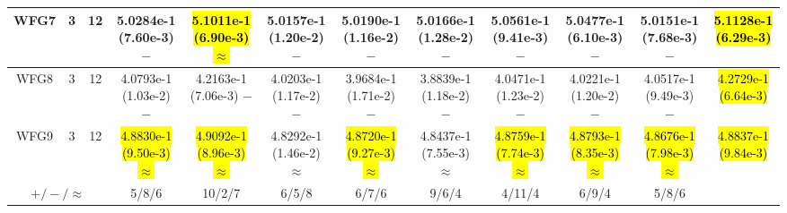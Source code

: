 \documentclass[journal]{IEEEtran}
\begin{document}
\begin{table*}[htbp]
\begin{tabular}{cccccccccccc}
\hline
\multirow{1}{*}{WFG7}&3&12&5.0284e-1 (7.60e-3) $-$&\hl{5.1011e-1 (6.90e-3) $\approx$}&5.0157e-1 (1.20e-2) $-$&5.0190e-1 (1.16e-2) $-$&5.0166e-1 (1.28e-2) $-$&5.0561e-1 (9.41e-3) $-$&5.0477e-1 (6.10e-3) $-$&5.0151e-1 (7.68e-3) $-$&\hl{5.1128e-1 (6.29e-3)}\\
\hline
\multirow{1}{*}{WFG8}&3&12&4.0793e-1 (1.03e-2) $-$&4.2163e-1 (7.06e-3) $-$&4.0203e-1 (1.17e-2) $-$&3.9684e-1 (1.71e-2) $-$&3.8839e-1 (1.18e-2) $-$&4.0471e-1 (1.23e-2) $-$&4.0221e-1 (1.20e-2) $-$&4.0517e-1 (9.49e-3) $-$&\hl{4.2729e-1 (6.64e-3)}\\
\hline
\multirow{1}{*}{WFG9}&3&12&\hl{4.8830e-1 (9.50e-3) $\approx$}&\hl{4.9092e-1 (8.96e-3) $\approx$}&4.8292e-1 (1.46e-2) $\approx$&\hl{4.8720e-1 (9.27e-3) $\approx$}&4.8437e-1 (7.55e-3) $\approx$&\hl{4.8759e-1 (7.74e-3) $\approx$}&\hl{4.8793e-1 (8.35e-3) $\approx$}&\hl{4.8676e-1 (7.98e-3) $\approx$}&\hl{4.8837e-1 (9.84e-3)}\\
\hline
\multicolumn{3}{c}{$+/-/\approx$}&5/8/6&10/2/7&6/5/8&6/7/6&9/6/4&4/11/4&6/9/4&5/8/6&\\
\bottomrule
\end{tabular}
\label{No Label}
\end{table*}
\end{document}
